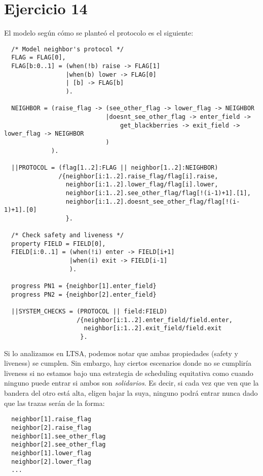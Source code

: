 \documentclass{article}
\begin{document}
\section*{Ejercicio 14}
El modelo según cómo se planteó el protocolo es el siguiente:
\begin{verbatim}
  /* Model neighbor's protocol */ 
  FLAG = FLAG[0],
  FLAG[b:0..1] = (when(!b) raise -> FLAG[1]
                 |when(b) lower -> FLAG[0]
                 | [b] -> FLAG[b]
                 ).

  NEIGHBOR = (raise_flag -> (see_other_flag -> lower_flag -> NEIGHBOR
                            |doesnt_see_other_flag -> enter_field ->
                                get_blackberries -> exit_field -> lower_flag -> NEIGHBOR
                            )
             ).

  ||PROTOCOL = (flag[1..2]:FLAG || neighbor[1..2]:NEIGHBOR)
               /{neighbor[i:1..2].raise_flag/flag[i].raise, 
                 neighbor[i:1..2].lower_flag/flag[i].lower,
                 neighbor[i:1..2].see_other_flag/flag[!(i-1)+1].[1],
                 neighbor[i:1..2].doesnt_see_other_flag/flag[!(i-1)+1].[0]
                 }.

  /* Check safety and liveness */ 
  property FIELD = FIELD[0],
  FIELD[i:0..1] = (when(!i) enter -> FIELD[i+1]
                  |when(i) exit -> FIELD[i-1]
                  ).

  progress PN1 = {neighbor[1].enter_field}
  progress PN2 = {neighbor[2].enter_field}

  ||SYSTEM_CHECKS = (PROTOCOL || field:FIELD)
                    /{neighbor[i:1..2].enter_field/field.enter,
                      neighbor[i:1..2].exit_field/field.exit 
                     }. 
\end{verbatim}

Si lo analizamos en LTSA, podemos notar que ambas propiedades (safety y liveness) se cumplen.
Sin embargo, hay ciertos escenarios donde no se cumpliría liveness si no estamos bajo una estrategia de scheduling equitativa como cuando ninguno puede entrar si ambos son \textit{solidarios}.
Es decir, si cada vez que ven que la bandera del otro está alta, eligen bajar la suya, ninguno podrá entrar nunca dado que las trazas serán de la forma:
\begin{verbatim}
  neighbor[1].raise_flag
  neighbor[2].raise_flag 
  neighbor[1].see_other_flag 
  neighbor[2].see_other_flag 
  neighbor[1].lower_flag 
  neighbor[2].lower_flag 
  ...
\end{verbatim}
\end{document}

